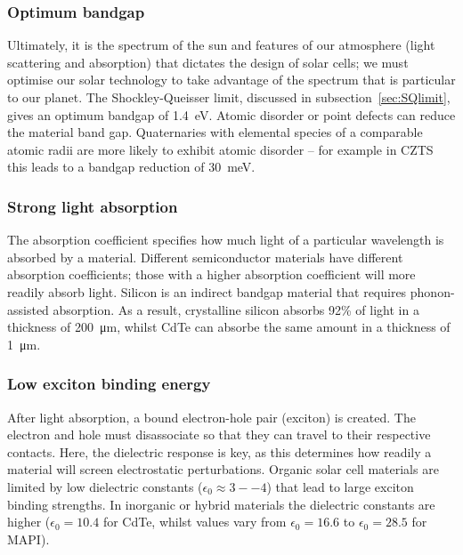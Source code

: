 \subsubsection{Optimum bandgap}
Ultimately, it is the spectrum of the sun and features of our atmosphere (light scattering and absorption) that dictates the design of solar cells; we must optimise our solar technology to take advantage of the spectrum that is particular to our planet. The Shockley-Queisser limit, discussed in subsection\ \ref{sec:SQlimit}, gives an optimum bandgap of \SI{1.4}{\electronvolt}.\autocite{Ruhle2016}
Atomic disorder or point defects can reduce the material band gap. Quaternaries with elemental species of a comparable atomic radii are more likely to exhibit atomic disorder -- for example in CZTS this leads to a bandgap reduction of \SI{30}{meV}.\autocite{Rey2018}

\subsubsection{Strong light absorption}
The absorption coefficient specifies how much light of a particular wavelength is absorbed by a material. Different semiconductor materials have different absorption coefficients; those with a higher absorption coefficient will more readily absorb light. Silicon is an indirect bandgap material that requires phonon-assisted absorption. As a result, crystalline silicon absorbs 92\% of light in a thickness of  \SI{200}{\micro\metre}, whilst CdTe can absorbe the same amount in a thickness of \SI{1}{\micro\metre}.\autocite{Poortmans2006}

\subsubsection{Low exciton binding energy}
After light absorption, a bound electron-hole pair (exciton) is created. The electron and hole must disassociate so that they can travel to their respective contacts. Here, the dielectric response is key, as this determines how readily a material will screen electrostatic perturbations. Organic solar cell materials are limited by low dielectric constants ($\epsilon_0 \approx 3--4$) that lead to large exciton binding strengths.\autocite{Brebels2017} In inorganic or hybrid materials the dielectric constants are higher ($\epsilon_0=10.4$ for CdTe,\autocite{Madelung2004} whilst values vary from $\epsilon_0=16.6$ to $\epsilon_0=28.5$ for MAPI\autocite{Wilson2019}).


